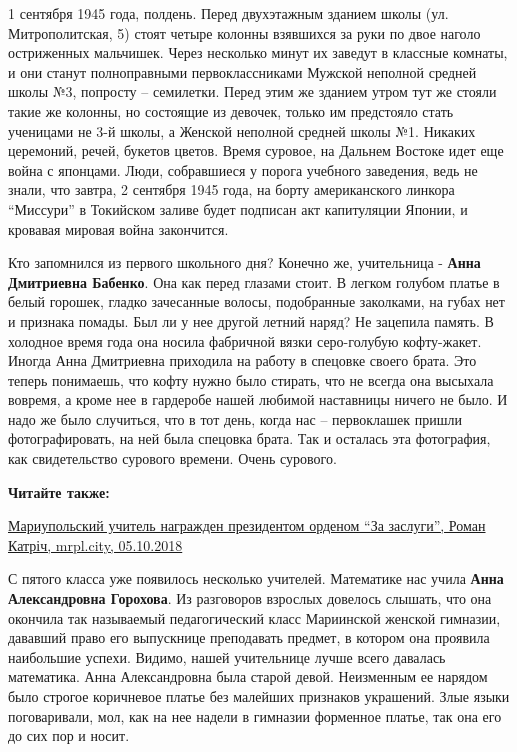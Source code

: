 
1 сентября 1945 года, полдень. Перед двухэтажным зданием школы (ул.
Митрополитская, 5) стоят четыре колонны взявшихся за руки по двое наголо
остриженных мальчишек. Через несколько минут их заведут в классные комнаты, и
они станут полноправными первоклассниками Мужской неполной средней школы №3,
попросту – семилетки. Перед этим же зданием утром тут же стояли такие же
колонны, но состоящие из девочек, только им предстояло стать ученицами не 3-й
школы, а Женской неполной средней школы №1. Никаких церемоний, речей, букетов
цветов. Время суровое, на Дальнем Востоке идет еще война с японцами. Люди,
собравшиеся у порога учебного заведения, ведь не знали, что завтра, 2 сентября
1945 года, на борту американского линкора \enquote{Миссури} в Токийском заливе
будет подписан акт капитуляции Японии, и кровавая мировая война закончится.


Кто запомнился из первого школьного дня? Конечно же, учительница - \textbf{Анна
Дмитриевна Бабенко}. Она как перед глазами стоит. В легком голубом платье в
белый горошек, гладко зачесанные волосы, подобранные заколками, на губах нет и
признака помады. Был ли у нее другой летний наряд? Не зацепила память. В
холодное время года она носила фабричной вязки серо-голубую кофту-жакет. Иногда
Анна Дмитриевна приходила на работу в спецовке своего брата. Это теперь
понимаешь, что кофту нужно было стирать, что не всегда она высыхала вовремя, а
кроме нее в гардеробе нашей любимой наставницы ничего не было. И надо же было
случиться, что в тот день, когда нас – первоклашек  пришли фотографировать, на
ней была спецовка брата. Так и осталась эта фотография, как свидетельство
сурового времени. Очень сурового.

\textbf{Читайте также:} 

\href{https://mrpl.city/news/view/mariupolskij-uchitel-nagrazhden-prezidentom-ordenom-za-zaslugi}{%
Мариупольский учитель награжден президентом орденом \enquote{За заслуги}, Роман Катріч, mrpl.city, 05.10.2018}

С пятого класса уже появилось несколько учителей.  Математике нас учила \textbf{Анна
Александровна Горохова}. Из разговоров взрослых довелось слышать, что она
окончила так называемый педагогический класс Мариинской женской гимназии,
дававший право его выпускнице преподавать предмет, в котором она проявила
наибольшие успехи. Видимо, нашей учительнице  лучше всего давалась математика.
Анна Александровна была старой девой. Неизменным ее нарядом было строгое
коричневое платье без малейших признаков украшений. Злые языки поговаривали,
мол, как на нее надели в гимназии форменное платье, так она его до сих пор и
носит.

